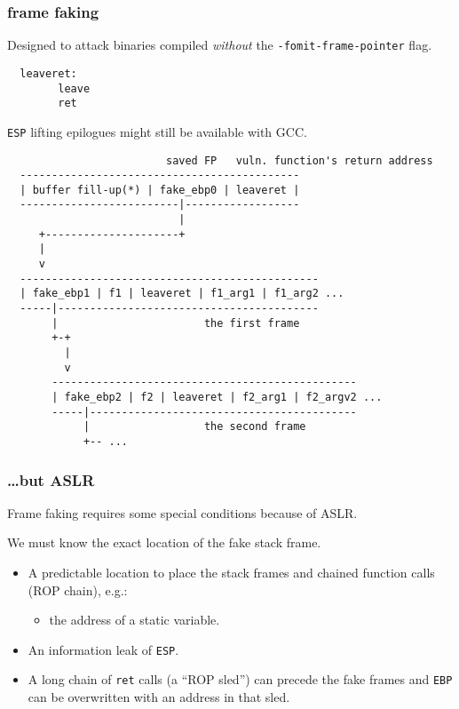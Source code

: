 \documentclass[10pt]{beamer}
\begin{document}
\begin{frame}[fragile]
  \frametitle{frame faking}
  Designed to attack binaries compiled \emph{without} the
  \texttt{-fomit-frame-pointer} flag.

  \begin{lstlisting}
  leaveret:
        leave
        ret
  \end{lstlisting}

  \texttt{ESP} lifting epilogues might still be available with GCC.
\end{frame}

\begin{frame}[fragile]
  \begin{lstlisting}
                         saved FP   vuln. function's return address
  --------------------------------------------
  | buffer fill-up(*) | fake_ebp0 | leaveret |
  -------------------------|------------------
                           |
     +---------------------+
     |
     v
  -----------------------------------------------
  | fake_ebp1 | f1 | leaveret | f1_arg1 | f1_arg2 ...
  -----|-----------------------------------------
       |                       the first frame
       +-+
         |
         v
       ------------------------------------------------
       | fake_ebp2 | f2 | leaveret | f2_arg1 | f2_argv2 ...
       -----|------------------------------------------
            |                  the second frame
            +-- ...
  \end{lstlisting}
\end{frame}


\begin{frame}
  \frametitle{\dots but ASLR}

  Frame faking requires some special conditions because of ASLR.

  We must know the exact location of the fake stack frame.

  \begin{itemize}
    \item A predictable location to place the stack frames and chained function
      calls (ROP chain), e.g.:
      \begin{itemize}
        \item the address of a static variable.
      \end{itemize}

    \item An information leak of \texttt{ESP}.

    \item A long chain of \texttt{ret} calls (a ``ROP sled'') can precede the
      fake frames and \texttt{EBP} can be overwritten with an address in that
      sled.
  \end{itemize}
\end{frame}
\end{document}
